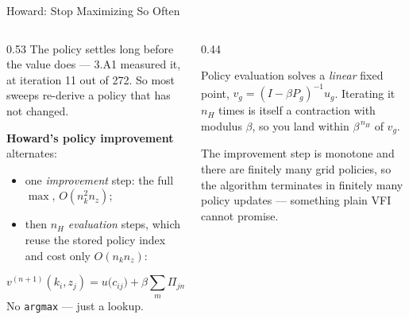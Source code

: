 \begin{frame}{Howard: Stop Maximizing So Often}
\begin{columns}[T]
\begin{column}{0.53\textwidth}
\small
The policy settles long before the value does --- 3.A1 measured it, at iteration 11 out of 272. So most sweeps re-derive a policy that has not changed.
\medskip

\textbf{Howard's policy improvement} alternates:
\begin{itemize}\footnotesize
  \item one \emph{improvement} step: the full $\max$, $O(n_k^{2}n_z)$;
  \item then $n_H$ \emph{evaluation} steps, which reuse the stored policy index and cost only $O(n_k n_z)$:
\end{itemize}
\[
  v^{(n+1)}(k_i,z_j)=u\big(c_{ij}\big)+\beta\!\sum_m\!\Pi_{jm}v^{(n)}\!\big(g(k_i,z_j),z_m\big).
\]
No \texttt{argmax} --- just a lookup.
\end{column}
\begin{column}{0.44\textwidth}
\begin{conceptbox}[title=\textbf{Why it converges}]\small
Policy evaluation solves a \emph{linear} fixed point, $v_g=(I-\beta P_g)^{-1}u_g$. Iterating it $n_H$ times is itself a contraction with modulus $\beta$, so you land within $\beta^{\,n_H}$ of $v_g$.
\end{conceptbox}
\medskip
\begin{examplebox}\footnotesize
The improvement step is monotone and there are finitely many grid policies, so the algorithm terminates in finitely many policy updates --- something plain VFI cannot promise.
\end{examplebox}
\end{column}
\end{columns}
\vspace{1mm}
\end{frame}

